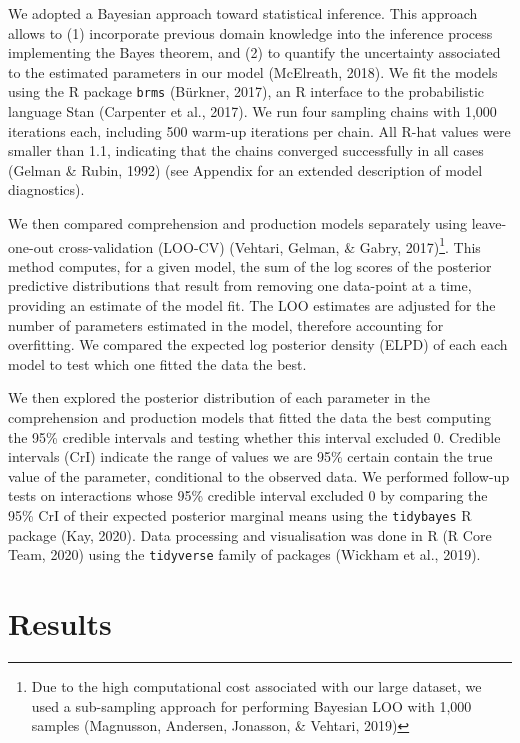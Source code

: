\documentclass[
  english,
  man,man,floatsintext]{apa6}
\begin{document}
We adopted a Bayesian approach toward statistical inference. This approach allows to (1) incorporate previous domain knowledge into the inference process implementing the Bayes theorem, and (2) to quantify the uncertainty associated to the estimated parameters in our model (McElreath, 2018).
We fit the models using the R package \texttt{brms} (Bürkner, 2017), an R interface to the probabilistic language Stan (Carpenter et al., 2017). We run four sampling chains with 1,000 iterations each, including 500 warm-up iterations per chain. All R-hat values were smaller than 1.1, indicating that the chains converged successfully in all cases (Gelman \& Rubin, 1992) (see Appendix for an extended description of model diagnostics).

We then compared comprehension and production models separately using leave-one-out cross-validation (LOO-CV) (Vehtari, Gelman, \& Gabry, 2017)\footnote{Due to the high computational cost associated with our large dataset, we used a sub-sampling approach for performing Bayesian LOO with 1,000 samples (Magnusson, Andersen, Jonasson, \& Vehtari, 2019)}. This method computes, for a given model, the sum of the log scores of the posterior predictive distributions that result from removing one data-point at a time, providing an estimate of the model fit. The LOO estimates are adjusted for the number of parameters estimated in the model, therefore accounting for overfitting. We compared the expected log posterior density (ELPD) of each each model to test which one fitted the data the best.

We then explored the posterior distribution of each parameter in the comprehension and production models that fitted the data the best computing the 95\% credible intervals and testing whether this interval excluded 0. Credible intervals (CrI) indicate the range of values we are 95\% certain contain the true value of the parameter, conditional to the observed data. We performed follow-up tests on interactions whose 95\% credible interval excluded 0 by comparing the 95\% CrI of their expected posterior marginal means using the \texttt{tidybayes} R package (Kay, 2020). Data processing and visualisation was done in R (R Core Team, 2020) using the \texttt{tidyverse} family of packages (Wickham et al., 2019).

\hypertarget{results}{%
\section{Results}\label{results}}
\end{document}

